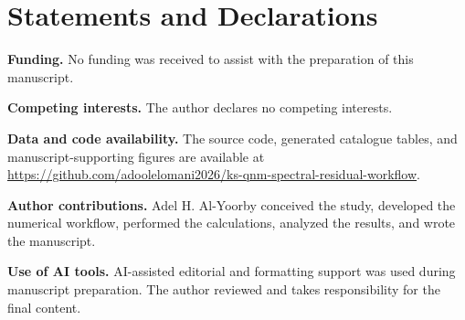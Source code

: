\documentclass[10pt,letterpaper,twocolumn]{article}
\begin{document}
\section*{Statements and Declarations}

\noindent\textbf{Funding.}
No funding was received to assist with the preparation of this manuscript.

\noindent\textbf{Competing interests.}
The author declares no competing interests.

\noindent\textbf{Data and code availability.}
The source code, generated catalogue tables, and manuscript-supporting figures are available at \url{https://github.com/adoolelomani2026/ks-qnm-spectral-residual-workflow}.

\noindent\textbf{Author contributions.}
Adel H. Al-Yoorby conceived the study, developed the numerical workflow, performed the calculations, analyzed the results, and wrote the manuscript.

\noindent\textbf{Use of AI tools.}
AI-assisted editorial and formatting support was used during manuscript preparation.
The author reviewed and takes responsibility for the final content.
\end{document}
